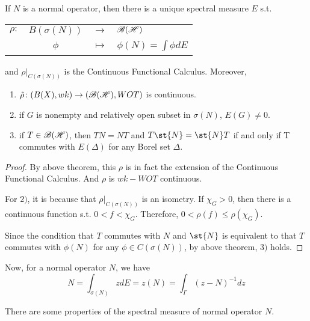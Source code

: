 \begin{thm}
	If $N$ is a normal operator, then there is a unique spectral measure $E$ s.t. 
	\begin{center}
		\begin{tabular}{l c c l}
			$\rho \colon$ & $B(\sigma(N))$ & $\longrightarrow$ & $\mathscr{B(H)}$ \\
			~ & $\phi$ & $\longmapsto$ & $\phi(N) = \int \phi dE$
		\end{tabular}
	\end{center}
	and $\rho|_{C(\sigma(N))}$ is the Continuous Functional Calculus. Moreover,
	\begin{enumerate}[label=\arabic*)]
		\item $\tilde{\rho} \colon (B(X),wk) \rightarrow (\mathscr{B(H)},WOT)$ is continuous.
		\item if $G$ is nonempty and relatively open subset in $\sigma(N)$, $E(G) \neq 0$.
		\item if $T \in \mathscr{B(H)}$, then $TN=NT$ and $T\st{N}=\st{N}T$ if and only if T commutes with $E(\Delta)$ for any Borel set $\Delta$.
	\end{enumerate}
\end{thm}
\begin{proof}
	By above theorem, this $\rho$ is in fact the extension of the Continuous Functional Calculus. And $\rho$ is $wk-WOT$ continuous. 
	\item For $2)$, it is because that $\rho|_{C(\sigma(N))}$ is an isometry. If $\chi_{G} > 0$, then there is a continuous function s.t. $0<f<\chi_{G}$. Therefore, $0 < \rho(f) \leqslant \rho(\chi_{G})$.
	\item Since the condition that $T$ commutes with $N$ and $\st{N}$ is equivalent to that $T$ commutes with $\phi(N)$ for any $\phi \in C(\sigma(N))$, by above theorem, $3)$ holds.
\end{proof}
\begin{rem}
	Now, for a normal operator $N$, we have
	\begin{equation*}
		N = \int_{\sigma(N)} z dE = z(N) = \int_{\Gamma} (z-N)^{-1} dz
	\end{equation*}
\end{rem}

There are some properties of the spectral measure of normal operator $N$.

